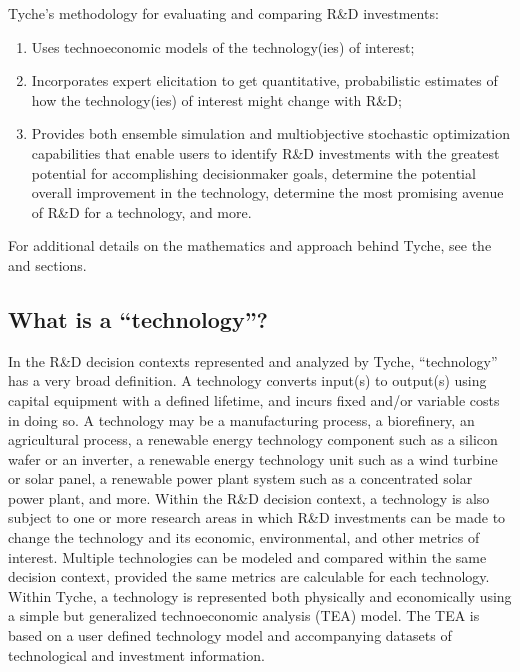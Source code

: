 \documentclass[letterpaper,10pt,english]{sphinxmanual}
\begin{document}
\sphinxAtStartPar
Tyche’s methodology for evaluating and comparing R\&D investments:
\begin{enumerate}
%
\item {} 
\sphinxAtStartPar
Uses techno\sphinxhyphen{}economic models of the technology(ies) of interest;

\item {} 
\sphinxAtStartPar
Incorporates expert elicitation to get quantitative, probabilistic estimates of how the technology(ies) of interest might change with R\&D;

\item {} 
\sphinxAtStartPar
Provides both ensemble simulation and multi\sphinxhyphen{}objective stochastic optimization capabilities that enable users to identify R\&D investments with the greatest potential for accomplishing decision\sphinxhyphen{}maker goals, determine the potential overall improvement in the technology, determine the most promising avenue of R\&D for a technology, and more.

\end{enumerate}

\sphinxAtStartPar
For additional details on the mathematics and approach behind Tyche, see the {\hyperref[\detokenize{formulation:sec-formulation}]{}} and {\hyperref[\detokenize{approach:sec-approach}]{}} sections.


\subsection{What is a “technology”?}
\label{\detokenize{cheat-sheet:what-is-a-technology}}
\sphinxAtStartPar
In the R\&D decision contexts represented and analyzed by Tyche, “technology” has a very broad definition. A technology converts input(s) to output(s) using capital equipment with a defined lifetime, and incurs fixed and/or variable costs in doing so. A technology may be a manufacturing process, a biorefinery, an agricultural process, a renewable energy technology component such as a silicon wafer or an inverter, a renewable energy technology unit such as a wind turbine or solar panel, a renewable power plant system such as a concentrated solar power plant, and more. Within the R\&D decision context, a technology is also subject to one or more research areas in which R\&D investments can be made to change the technology and its economic, environmental, and other metrics of interest. Multiple technologies can be modeled and compared within the same decision context, provided the same metrics are calculable for each technology. Within Tyche, a technology is represented both physically and economically using a simple but generalized techno\sphinxhyphen{}economic analysis (TEA) model. The TEA is based on a user defined technology model and accompanying datasets of technological and investment information.
\end{document}
